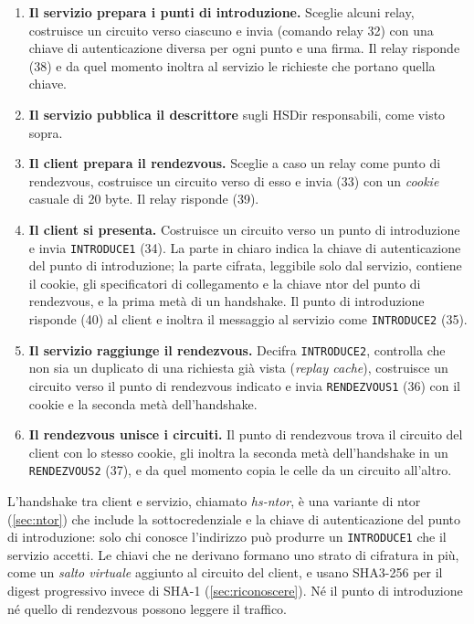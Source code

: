 \begin{enumerate}
  \item \textbf{Il servizio prepara i punti di introduzione.} Sceglie alcuni relay, costruisce un circuito verso ciascuno e invia  (comando relay 32) con una chiave di autenticazione diversa per ogni punto e una firma. Il relay risponde  (38) e da quel momento inoltra al servizio le richieste che portano quella chiave.
  \item \textbf{Il servizio pubblica il descrittore} sugli HSDir responsabili, come visto sopra.
  \item \textbf{Il client prepara il rendezvous.} Sceglie a caso un relay come punto di rendezvous, costruisce un circuito verso di esso e invia  (33) con un \emph{cookie} casuale di 20 byte. Il relay risponde  (39).
  \item \textbf{Il client si presenta.} Costruisce un circuito verso un punto di introduzione e invia \texttt{INTRODUCE1} (34). La parte in chiaro indica la chiave di autenticazione del punto di introduzione; la parte cifrata, leggibile solo dal servizio, contiene il cookie, gli specificatori di collegamento e la chiave ntor del punto di rendezvous, e la prima metà di un handshake. Il punto di introduzione risponde  (40) al client e inoltra il messaggio al servizio come \texttt{INTRODUCE2} (35).
  \item \textbf{Il servizio raggiunge il rendezvous.} Decifra \texttt{INTRODUCE2}, controlla che non sia un duplicato di una richiesta già vista (\emph{replay cache}), costruisce un circuito verso il punto di rendezvous indicato e invia \texttt{RENDEZVOUS1} (36) con il cookie e la seconda metà dell'handshake.
  \item \textbf{Il rendezvous unisce i circuiti.} Il punto di rendezvous trova il circuito del client con lo stesso cookie, gli inoltra la seconda metà dell'handshake in un \texttt{RENDEZVOUS2} (37), e da quel momento copia le celle da un circuito all'altro.
\end{enumerate}

L'handshake tra client e servizio, chiamato \emph{hs-ntor}, è una variante di ntor (\cref{sec:ntor}) che include la sottocredenziale e la chiave di autenticazione del punto di introduzione: solo chi conosce l'indirizzo può produrre un \texttt{INTRODUCE1} che il servizio accetti. Le chiavi che ne derivano formano uno strato di cifratura in più, come un \emph{salto virtuale} aggiunto al circuito del client, e usano SHA3-256 per il digest progressivo invece di SHA-1 (\cref{sec:riconoscere}). Né il punto di introduzione né quello di rendezvous possono leggere il traffico.

